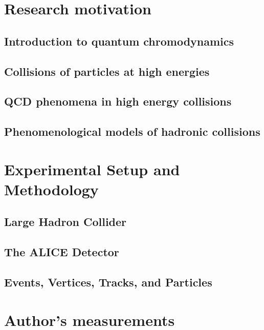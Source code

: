 \documentclass[11pt]{book}
\begin{document}
\mainmatter
\setcounter{table}{0} 
\setcounter{page}{1}

\chap{\myTitle}
\newpage

\part{Research motivation}
\chapter{Introduction to quantum chromodynamics}

\chapter{Collisions of particles at high energies}

\chapter{QCD phenomena in high energy collisions}

\chapter{Phenomenological models of hadronic collisions}


\part{Experimental Setup and Methodology}
\chapter{Large Hadron Collider}

\chapter{The ALICE Detector}

\chapter{Events, Vertices, Tracks, and Particles}


\part{Author's measurements}
\end{document}
